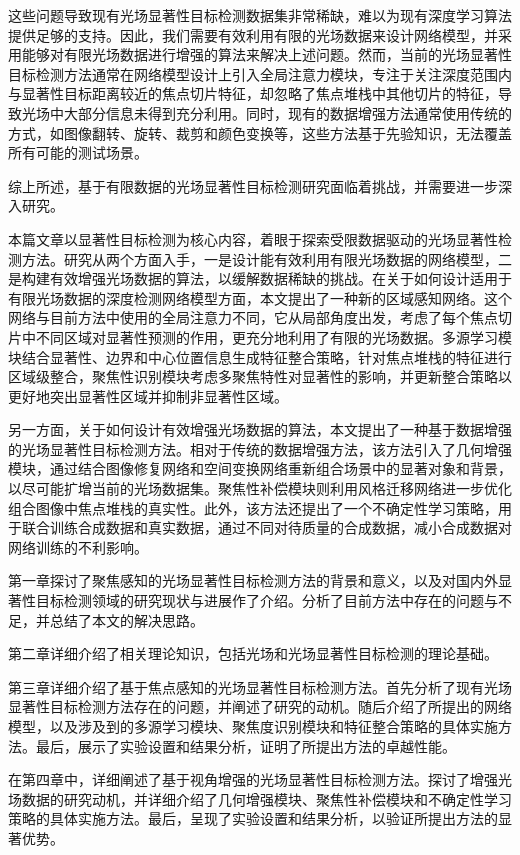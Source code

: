 这些问题导致现有光场显著性目标检测数据集非常稀缺，难以为现有深度学习算法提供足够的支持。因此，我们需要有效利用有限的光场数据来设计网络模型，并采用能够对有限光场数据进行增强的算法来解决上述问题。然而，当前的光场显著性目标检测方法通常在网络模型设计上引入全局注意力模块，专注于关注深度范围内与显著性目标距离较近的焦点切片特征，却忽略了焦点堆栈中其他切片的特征，导致光场中大部分信息未得到充分利用。同时，现有的数据增强方法通常使用传统的方式，如图像翻转、旋转、裁剪和颜色变换等，这些方法基于先验知识，无法覆盖所有可能的测试场景。

综上所述，基于有限数据的光场显著性目标检测研究面临着挑战，并需要进一步深入研究。



本篇文章以显著性目标检测为核心内容，着眼于探索受限数据驱动的光场显著性检测方法。研究从两个方面入手，一是设计能有效利用有限光场数据的网络模型，二是构建有效增强光场数据的算法，以缓解数据稀缺的挑战。在关于如何设计适用于有限光场数据的深度检测网络模型方面，本文提出了一种新的区域感知网络。这个网络与目前方法中使用的全局注意力不同，它从局部角度出发，考虑了每个焦点切片中不同区域对显著性预测的作用，更充分地利用了有限的光场数据。多源学习模块结合显著性、边界和中心位置信息生成特征整合策略，针对焦点堆栈的特征进行区域级整合，聚焦性识别模块考虑多聚焦特性对显著性的影响，并更新整合策略以更好地突出显著性区域并抑制非显著性区域。

另一方面，关于如何设计有效增强光场数据的算法，本文提出了一种基于数据增强的光场显著性目标检测方法。相对于传统的数据增强方法，该方法引入了几何增强模块，通过结合图像修复网络和空间变换网络重新组合场景中的显著对象和背景，以尽可能扩增当前的光场数据集。聚焦性补偿模块则利用风格迁移网络进一步优化组合图像中焦点堆栈的真实性。此外，该方法还提出了一个不确定性学习策略，用于联合训练合成数据和真实数据，通过不同对待质量的合成数据，减小合成数据对网络训练的不利影响。



第一章探讨了聚焦感知的光场显著性目标检测方法的背景和意义，以及对国内外显著性目标检测领域的研究现状与进展作了介绍。分析了目前方法中存在的问题与不足，并总结了本文的解决思路。

第二章详细介绍了相关理论知识，包括光场和光场显著性目标检测的理论基础。

第三章详细介绍了基于焦点感知的光场显著性目标检测方法。首先分析了现有光场显著性目标检测方法存在的问题，并阐述了研究的动机。随后介绍了所提出的网络模型，以及涉及到的多源学习模块、聚焦度识别模块和特征整合策略的具体实施方法。最后，展示了实验设置和结果分析，证明了所提出方法的卓越性能。

在第四章中，详细阐述了基于视角增强的光场显著性目标检测方法。探讨了增强光场数据的研究动机，并详细介绍了几何增强模块、聚焦性补偿模块和不确定性学习策略的具体实施方法。最后，呈现了实验设置和结果分析，以验证所提出方法的显著优势。

